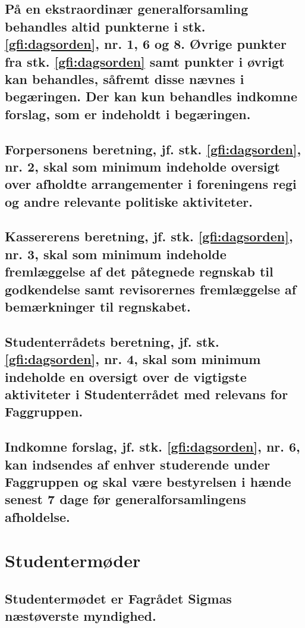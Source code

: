 \documentclass[10pt]{article}
\begin{document}
	\subsection{På en ekstraordinær generalforsamling behandles altid punkterne i stk. \ref{gfi:dagsorden}, nr. 1, 6 og 8. Øvrige punkter fra stk. \ref{gfi:dagsorden} samt punkter i øvrigt kan behandles, såfremt disse nævnes i begæringen. Der kan kun behandles indkomne forslag, som er indeholdt i begæringen.}\label{gfi:ekstra}
	
	\subsection{Forpersonens beretning, jf. stk. \ref{gfi:dagsorden}, nr. 2, skal som minimum indeholde oversigt over afholdte arrangementer i foreningens regi og andre relevante politiske aktiviteter.}
	
	\subsection{Kassererens beretning, jf. stk. \ref{gfi:dagsorden}, nr. 3, skal som minimum indeholde fremlæggelse af det påtegnede regnskab til godkendelse samt revisorernes fremlæggelse af bemærkninger til regnskabet.}
	
	\subsection{Studenterrådets beretning, jf. stk. \ref{gfi:dagsorden}, nr. 4, skal som minimum indeholde en oversigt over de vigtigste aktiviteter i Studenterrådet med relevans for Faggruppen.}
	
	\subsection{Indkomne forslag, jf. stk. \ref{gfi:dagsorden}, nr. 6, kan indsendes af enhver studerende under Faggruppen og skal være bestyrelsen i hænde senest 7 dage før generalforsamlingens afholdelse.}
	
	\section{Studentermøder}
	
	\subsection{Studentermødet er Fagrådet Sigmas næstøverste myndighed.}
	
\end{document}

